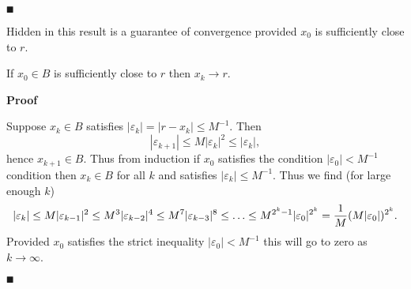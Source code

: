 \ensuremath{\QED}

Hidden in this result is a guarantee of convergence provided $x_0$ is sufficiently close to $r$.

\begin{corollary} If $x_0 \ensuremath{\in} B$ is sufficiently close to $r$ then $x_k \ensuremath{\rightarrow} r$.

\end{corollary}
\textbf{Proof}

Suppose $x_k \ensuremath{\in} B$ satisfies $|\ensuremath{\varepsilon}_k| = |r-x_k| \ensuremath{\leq} M^{-1}$. Then
\[
|\ensuremath{\varepsilon}_{k+1}| \ensuremath{\leq} M |\ensuremath{\varepsilon}_k|^2 \ensuremath{\leq} |\ensuremath{\varepsilon}_k|,
\]
hence $x_{k+1} \ensuremath{\in} B$. Thus from induction if $x_0$ satisfies the condition $|\ensuremath{\varepsilon}_0| < M^{-1}$ condition then $x_k \ensuremath{\in} B$ for all $k$ and satisfies $|\ensuremath{\varepsilon}_k| \ensuremath{\leq} M^{-1}$.  Thus we find (for large enough $k$)
\[
|\ensuremath{\varepsilon}_k| \ensuremath{\leq} M |\ensuremath{\varepsilon}_{k-1}|^2 \ensuremath{\leq} M^3 |\ensuremath{\varepsilon}_{k-2}|^4 \ensuremath{\leq} M^7 |\ensuremath{\varepsilon}_{k-3}|^8 \ensuremath{\leq} \ensuremath{\ldots} \ensuremath{\leq} M^{2^k-1} |\ensuremath{\varepsilon}_0|^{2^k} = {1 \over M} (M|\ensuremath{\varepsilon}_0|)^{2^k}.
\]
Provided $x_0$  satisfies the strict inequality $|\ensuremath{\varepsilon}_0| < M^{-1}$ this will go to zero as $k \ensuremath{\rightarrow} \ensuremath{\infty}$.

\ensuremath{\QED}



